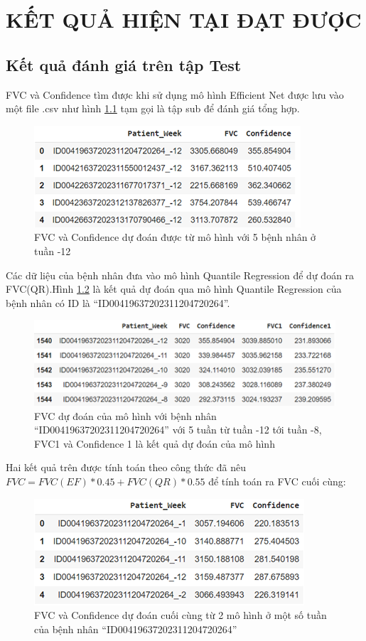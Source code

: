 \chapter{KẾT QUẢ HIỆN TẠI ĐẠT ĐƯỢC}
\section{Kết quả đánh giá trên tập Test}
FVC và Confidence tìm được khi sử dụng mô hình Efficient Net được lưu vào một file .csv như hình \ref{fig:res1} tạm gọi là tập sub để đánh giá tổng hợp.\par
\begin{figure}[ht!]
\centerline{\includegraphics[scale=1.2]{images/res1.png}}
\caption{FVC và Confidence dự đoán được từ mô hình với 5 bệnh nhân ở tuần -12}
\label{fig:res1}
\end{figure} 
Các dữ liệu của bệnh nhân đưa vào mô hình Quantile Regression để dự đoán ra FVC(QR).Hình \ref{fig:res2} là kết quả dự đoán qua mô hình Quantile Regression của bệnh nhân có ID là “ID00419637202311204720264”.\par
\begin{figure}[ht!]
\centerline{\includegraphics[scale=1.1]{images/res2.png}}
\caption{FVC dự đoán của mô hình với bệnh nhân “ID00419637202311204720264” với 5 tuần từ tuần -12 tới tuần -8, FVC1 và Confidence 1 là kết quả dự đoán của mô hình}
\label{fig:res2}
\end{figure}
Hai kết quả trên được tính toán theo công thức đã nêu $FVC= FVC(EF)*0.45+ FVC(QR)*0.55$ để tính toán ra FVC cuối cùng:\par
\begin{figure}[ht!]
\centerline{\includegraphics[scale=1.0]{images/res3.png}}
\caption{FVC và Confidence dự đoán cuối cùng từ 2 mô hình ở một số tuần của bệnh nhân “ID00419637202311204720264”}
\label{fig:res3}
\end{figure}


